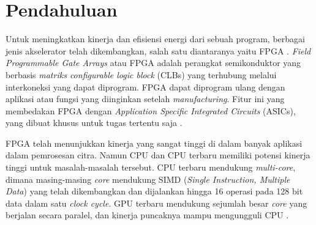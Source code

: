 ﻿\section{Pendahuluan}



Untuk meningkatkan kinerja dan efisiensi energi dari sebuah program, berbagai jenis akselerator telah dikembangkan, salah satu diantaranya yaitu FPGA \cite{lb:cong}. \textit{Field Programmable Gate Arrays} atau FPGA adalah perangkat semikonduktor yang berbasis \textit{matriks configurable logic block} (CLBs) yang terhubung melalui interkoneksi yang dapat diprogram. FPGA dapat diprogram ulang dengan aplikasi atau fungsi yang diinginkan setelah \textit{manufacturing}. Fitur ini yang membedakan FPGA dengan \textit{Application Specific Integrated Circuits} (ASICs), yang dibuat khusus untuk tugas tertentu saja \cite{XILINX}.

FPGA telah menunjukkan kinerja yang sangat tinggi di dalam banyak aplikasi dalam pemrosesan citra. Namun CPU dan CPU terbaru memiliki potensi kinerja tinggi untuk masalah-masalah tersebut. CPU terbaru mendukung \textit{multi-core}, dimana masing-masing \textit{core} mendukung SIMD (\textit{Single Instruction, Multiple Data}) yang telah dikembangkan dan dijalankan hingga 16 operasi pada 128 bit data dalam satu \textit{clock cycle}. GPU terbaru mendukung sejumlah besar \textit{core} yang berjalan secara paralel, dan kinerja puncaknya mampu mengungguli CPU \cite{lb:asano}.

